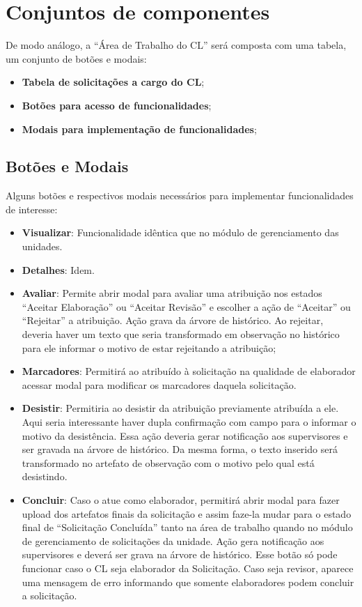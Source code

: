 \section{Conjuntos de componentes}

De modo análogo, a ``Área de Trabalho do CL'' será composta com uma tabela, um conjunto de botões e modais:

\begin{itemize}
	\item \textbf{Tabela de solicitações a cargo do CL};
	\item \textbf{Botões para acesso de funcionalidades};
	\item \textbf{Modais para implementação de funcionalidades};
\end{itemize}

\subsection{Botões e Modais} 	

Alguns botões e respectivos modais necessários para implementar funcionalidades de interesse:
\begin{itemize}
	\item \textbf{Visualizar}: Funcionalidade idêntica que no módulo de gerenciamento das unidades.
	
	\item \textbf{Detalhes}: Idem.
	
	\item \textbf{Avaliar}: Permite abrir modal para avaliar uma atribuição nos estados ``Aceitar Elaboração'' ou ``Aceitar Revisão'' e escolher a ação de ``Aceitar'' ou ``Rejeitar'' a atribuição. Ação grava da árvore de histórico.  Ao rejeitar, deveria haver um texto que seria transformado em observação no histórico para ele informar o motivo de estar rejeitando a atribuição;

	\item \textbf{Marcadores}: Permitirá ao \CL atribuído à solicitação na qualidade de elaborador acessar modal para modificar os marcadores daquela solicitação.

	\item \textbf{Desistir}: Permitiria ao \CL desistir da atribuição previamente atribuída a ele. Aqui seria interessante haver dupla confirmação com campo para o \CL informar o motivo da desistência. Essa ação deveria gerar notificação aos supervisores e ser gravada na árvore de histórico. Da mesma forma, o texto inserido será transformado no artefato de observação com o motivo pelo qual está desistindo.
	
	\item \textbf{Concluir}: Caso o \CL atue como elaborador, permitirá abrir modal para fazer upload dos artefatos finais da solicitação e assim faze-la mudar para o estado final de ``Solicitação Concluída'' tanto na área de trabalho quando no módulo de gerenciamento de solicitações da unidade. Ação gera notificação aos supervisores e deverá ser grava na árvore de histórico. Esse botão só pode funcionar caso o CL seja elaborador da Solicitação. Caso seja revisor, aparece uma mensagem de erro informando que somente elaboradores podem concluir a solicitação. 
\end{itemize}


